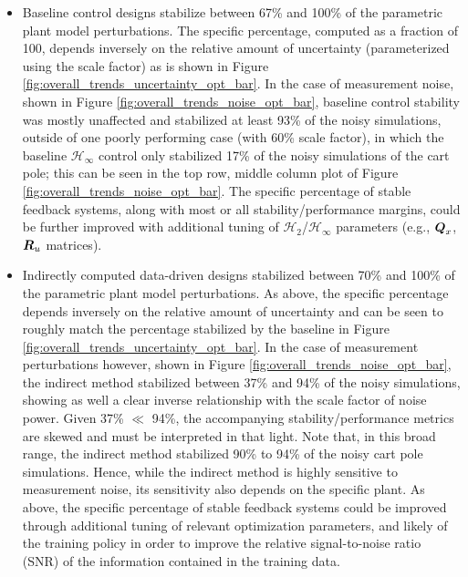 \begin{itemize}
\item{Baseline control designs stabilize between 67\% and 100\% of the parametric plant model perturbations.  The specific percentage, computed as a fraction of 100, depends inversely on the relative amount of uncertainty (parameterized using the scale factor) as is shown in Figure \ref{fig:overall_trends_uncertainty_opt_bar}.  In the case of measurement noise, shown in Figure \ref{fig:overall_trends_noise_opt_bar}, baseline control stability was mostly unaffected and stabilized at least 93\% of the noisy simulations, outside of one poorly performing case (with 60\% scale factor), in which the baseline $\mathcal{H}_{\infty}$ control only stabilized 17\% of the noisy simulations of the cart pole; this can be seen in the top row, middle column plot of Figure \ref{fig:overall_trends_noise_opt_bar}.  The specific percentage of stable feedback systems, along with most or all stability/performance margins, could be further improved with additional tuning of $\mathcal{H}_{2}$/$\mathcal{H}_{\infty}$ parameters (e.g., $\vb*{Q}_{x}$, $\vb*{R}_{u}$ matrices).}
%
\item{Indirectly computed data-driven designs stabilized between 70\% and 100\% of the parametric plant model perturbations.  As above, the specific percentage depends inversely on the relative amount of uncertainty and can be seen to roughly match the percentage stabilized by the baseline in Figure \ref{fig:overall_trends_uncertainty_opt_bar}.  In the case of measurement perturbations however, shown in Figure \ref{fig:overall_trends_noise_opt_bar}, the indirect method stabilized between 37\% and 94\% of the noisy simulations, showing as well a clear inverse relationship with the scale factor of noise power.  Given 37\% $\ll$ 94\%, the accompanying stability/performance metrics are skewed and must be interpreted in that light.  Note that, in this broad range, the indirect method stabilized 90\% to 94\% of the noisy cart pole simulations.  Hence, while the indirect method is highly sensitive to measurement noise, its sensitivity also depends on the specific plant.  As above, the specific percentage of stable feedback systems could be improved through additional tuning of relevant optimization parameters, and likely of the training policy in order to improve the relative signal-to-noise ratio (SNR) of the information contained in the training data.}
%

\end{itemize}
